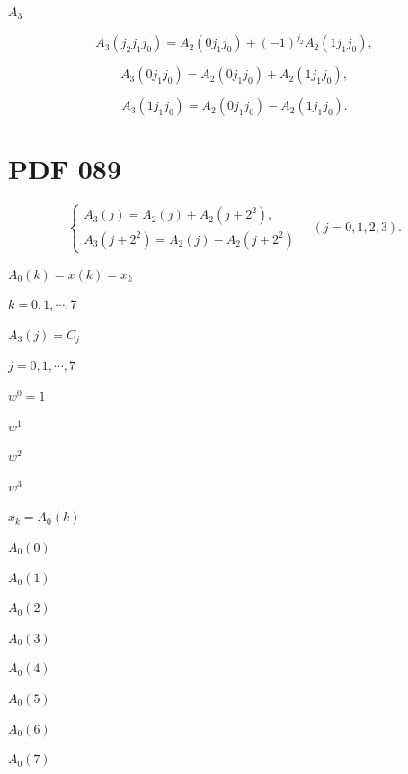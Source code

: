 \documentclass[UTF8,fontset=fandol,a4paper]{ctexart}
\begin{document}
\noindent $A_3$\par

\[
A_3(j_2j_1j_0)=A_2(0j_1j_0)+(-1)^{j_2}A_2(1j_1j_0),
\]

\[
A_3(0j_1j_0)=A_2(0j_1j_0)+A_2(1j_1j_0),
\]

\[
A_3(1j_1j_0)=A_2(0j_1j_0)-A_2(1j_1j_0).
\]

\section*{PDF 089}

\[
\begin{cases}
A_3(j)=A_2(j)+A_2(j+2^2),\\
A_3(j+2^2)=A_2(j)-A_2(j+2^2)
\end{cases}\quad(j=0,1,2,3).\tag{3.7.15}
\]

\noindent $A_0(k)=x(k)=x_k$\par

\noindent $k=0,1,\cdots,7$\par

\noindent $A_3(j)=C_j$\par

\noindent $j=0,1,\cdots,7$\par

\noindent $w^0=1$\par

\noindent $w^1$\par

\noindent $w^2$\par

\noindent $w^3$\par

\noindent $x_k=A_0(k)$\par

\noindent $A_0(0)$\par

\noindent $A_0(1)$\par

\noindent $A_0(2)$\par

\noindent $A_0(3)$\par

\noindent $A_0(4)$\par

\noindent $A_0(5)$\par

\noindent $A_0(6)$\par

\noindent $A_0(7)$\par
\end{document}
